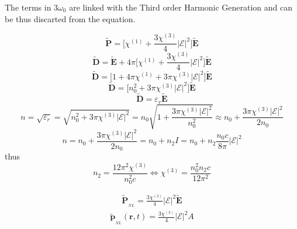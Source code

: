 \documentclass[11pt,a4paper]{article}
\begin{document}
The terms in $3\omega_0$ are linked with the Third order Harmonic Generation and can be thus discarted from the equation. 

\begin{equation*}
\tilde{\mathbf{P}} = \bigg[\chi^{(1)}+ \frac{3\chi^{(3)}}{4}|\mathcal{E}|^2\bigg]\tilde{\mathbf{E}}
\end{equation*}
\begin{equation*}
\tilde{\mathbf{D}} =\tilde{\mathbf{E}} + 4\pi\Bigg[\chi^{(1)}+ \frac{3\chi^{(3)}}{4}|\mathcal{E}|^2\Bigg]\tilde{\mathbf{E}}
\end{equation*}
\begin{equation*}
\tilde{\mathbf{D}} = \bigg[1+4\pi\chi^{(1)}+ 3\pi\chi^{(3)}|\mathcal{E}|^2\bigg]\tilde{\mathbf{E}}
\end{equation*}
\begin{equation*}
\tilde{\mathbf{D}} = \bigg[n_0^2+ 3\pi\chi^{(3)}|\mathcal{E}|^2\bigg]\tilde{\mathbf{E}}
\end{equation*}
\begin{equation*}
\tilde{\mathbf{D}} = \varepsilon_r\tilde{\mathbf{E}}
\end{equation*}
\begin{equation*}
n = \sqrt{\varepsilon_r} = \sqrt{n_0^2+ 3\pi\chi^{(3)}|\mathcal{E}|^2}= n_0\sqrt{1+\frac{3\pi\chi^{(3)}|\mathcal{E}|^2}{n_0^2}}\approx n_0 + \frac{3\pi\chi^{(3)}|\mathcal{E}|^2}{2n_0}
\end{equation*}
\begin{equation*}
n = n_0 + \frac{3\pi\chi^{(3)}|\mathcal{E}|^2}{2n_0} = n_0+n_2I = n_0 +n_2\frac{n_0c}{8\pi}|\mathcal{E}|^2
\end{equation*}
thus
\begin{equation*}
n_2 = \frac{12\pi^2\chi^{(3)}}{n_0^2c} \Longleftrightarrow \chi^{(3)}=\frac{n_0^2n_2c}{
12\pi^2}
\end{equation*}

\begin{equation*}
\begin{split}
\tilde{\mathbf{P}}_{_{NL}} = \frac{3\chi^{(3)}}{4}|\mathcal{E}|^2\tilde{\mathbf{E}}
\end{split}
\end{equation*}
\begin{equation*}
\begin{split}
\tilde{\mathbf{p}}_{_{NL}}(\mathbf{r},t) =  \frac{3\chi^{(3)}}{4}|\mathcal{E}|^2A
\end{split}
\end{equation*}
\end{document}
